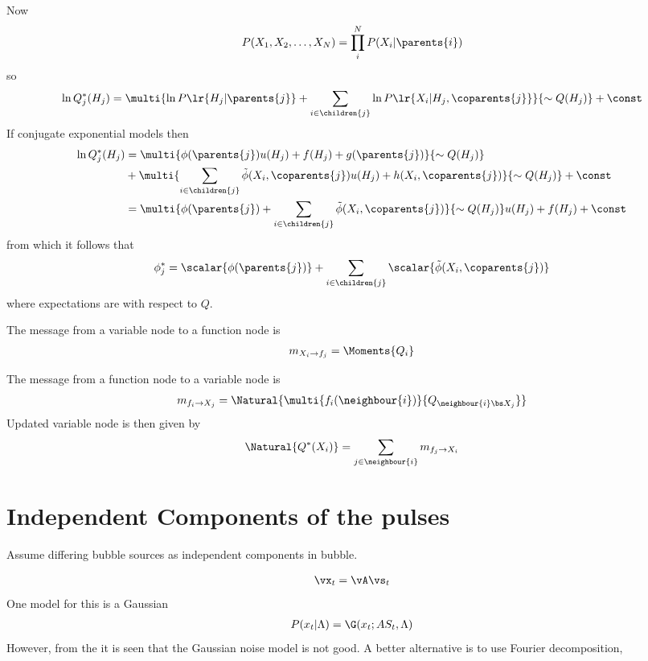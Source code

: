 {Now 
\begin{align}
  P(X_1, X_2, \ldots, X_N) = \prod_i^N P(X_i|\parents{i})
\end{align}
 so 
 \begin{align}
 \ln Q^\ast_j(H_j) = \multi{\ln P\lr{H_j|\parents{j}} + \sum_{i \in  \children{j}} \ln P\lr{X_i| H_j, \coparents{j}}}{\sim Q(H_j)} + \const
 \end{align}
If conjugate exponential models then
\begin{align}
\ln Q^\ast_j(H_j) &= \multi{\phi(\parents{j}) u(H_j) + f(H_j) + g(\parents{j}) }{\sim Q(H_j)}
\nonumber \\
&+\multi{\sum_{i \in  \children{j}}  \tilde\phi(X_i,\coparents{j}) u(H_j) + h(X_i,\coparents{j})  }{\sim Q(H_j)} + \const\\
&= \multi{\phi(\parents{j}) + \sum_{i \in  \children{j}}  \tilde\phi(X_i,\coparents{j}) }{\sim Q(H_j)} u(H_j)+ f(H_j)+\const
\end{align}
from which it follows that
\begin{align}
  \phi^\ast_j = \scalar{\phi(\parents{j})} + \sum_{i \in  \children{j}}  \scalar{\tilde\phi(X_i,\coparents{j}) }
\end{align}
where expectations are with respect to $Q$.

The message from a variable node to a function node is
\begin{align}
  m_{X_i\rightarrow f_j} = \Moments{Q_i}
\end{align}

The message from a function node to a variable node is
\begin{align}
  m_{f_i\rightarrow X_j} = \Natural{\multi{f_i(\neighbour{i})}{Q_{{\neighbour{i} \bs X_j}}}}
\end{align}
Updated variable node is then given by
\begin{align}
  \Natural{Q^\ast(X_i)} = \sum_{j\in\neighbour{i}} m_{f_j \rightarrow X_i}
\end{align}







\section{Independent Components of the pulses}

Assume differing bubble sources as independent components in bubble.

\begin{align}
\vx_t = \vA \vs_t
\end{align}
One model for this is a Gaussian
\begin{align}
  P(x_t| \Lambda) = \G(x_t; AS_t, \Lambda)
\end{align}
However,
from the \figref{} it is seen that the Gaussian noise model is not good.
A better alternative is to use Fourier decomposition,

}
